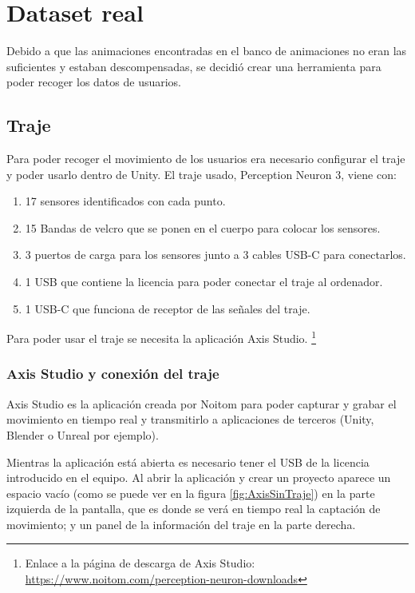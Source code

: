 \section{Dataset real}
\label{sec:datasetReal}
Debido a que las animaciones encontradas en el banco de animaciones no eran las suficientes y estaban descompensadas, se decidió crear una herramienta para poder recoger los datos de usuarios.

\subsection{Traje}
\label{sec:traje}

Para poder recoger el movimiento de los usuarios era necesario configurar el traje y poder usarlo dentro de Unity.
El traje usado, Perception Neuron 3, viene con:

\begin{enumerate}
	\renewcommand{\theenumi}{\alph{enumi}}
	\item 17 sensores identificados con cada punto.
	\item 15 Bandas de velcro que se ponen en el cuerpo para colocar los sensores.
	\item 3 puertos de carga para los sensores junto a 3 cables USB-C para conectarlos.
	\item 1 USB que contiene la licencia para poder conectar el traje al ordenador.
	\item 1 USB-C que funciona de receptor de las señales del traje.
\end{enumerate}

Para poder usar el traje se necesita la aplicación Axis Studio. \footnote{Enlace a la página de descarga de Axis Studio: \url{https://www.noitom.com/perception-neuron-downloads}}
\subsubsection{Axis Studio y conexión del traje}
Axis Studio es la aplicación creada por Noitom para poder capturar y grabar el movimiento en tiempo real y transmitirlo a aplicaciones de terceros (Unity, Blender o Unreal por ejemplo).

Mientras la aplicación está abierta es necesario tener el USB de la licencia introducido en el equipo.
Al abrir la aplicación y crear un proyecto aparece un espacio vacío (como se puede ver en la figura \ref{fig:AxisSinTraje}) en la parte izquierda de la pantalla, que es donde se verá en tiempo real la captación de movimiento; y un panel de la información del traje en la parte derecha.

